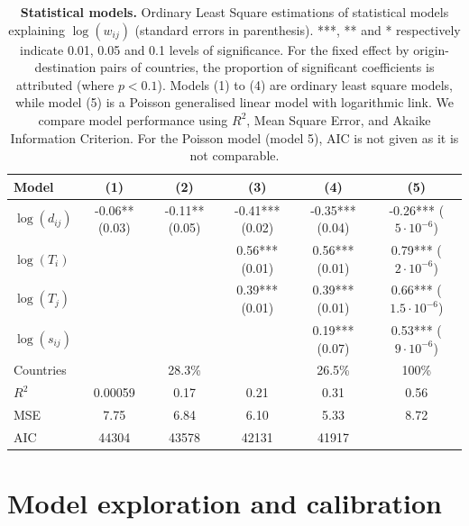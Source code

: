 \documentclass[10pt,letterpaper]{article}
\begin{document}
\begin{table}[!ht]
\begin{adjustwidth}{-1in}{0in}
\caption{{\bf Statistical models.} Ordinary Least Square estimations of statistical models explaining $\log(w_{ij})$ (standard errors in parenthesis). ***, ** and * respectively indicate 0.01, 0.05 and 0.1 levels of significance. For the fixed effect by origin-destination pairs of countries, the proportion of significant coefficients is attributed (where $p<0.1$). Models (1) to (4) are ordinary least square models, while model (5) is a Poisson generalised linear model with logarithmic link. We compare model performance using $R^2$, Mean Square Error, and Akaike Information Criterion. For the Poisson model (model 5), AIC is not given as it is not comparable. \label{tab:reg}}
\medskip
\begin{tabular}{|l|c|c|c|c|c|}
\hline
Model  & (1) & (2) & (3) & (4) & (5) \\ 
\hline
$\log(d_{ij})$ &      -0.06** (0.03) &   -0.11** (0.05)  & -0.41*** (0.02)  & -0.35*** (0.04)  &  -0.26*** ($5\cdot 10^{-6}$) \\
$\log(T_i)$ &   &   & 0.56*** (0.01) &  0.56*** (0.01) & 0.79*** ($2\cdot 10^{-6}$) \\
$\log(T_j)$ &     &   & 0.39*** (0.01) &  0.39*** (0.01) & 0.66***  ($1.5\cdot 10^{-6}$) \\
$\log(s_{ij})$ &     &   &  &  0.19*** (0.07) & 0.53*** ($9\cdot 10^{-6}$)  \\
Countries &    &  28.3\% &   &  26.5\% & 100\% \\
\hline
$R^2$ &       0.00059   &  0.17 & 0.21 &  0.31  &  0.56 \\
MSE & 7.75 & 6.84 & 6.10 & 5.33 & 8.72 \\
AIC &        44304   &  43578  &  42131  & 41917 &   \\
\hline
\end{tabular}
\end{adjustwidth}
\end{table}





\section*{Model exploration and calibration}
\end{document}
